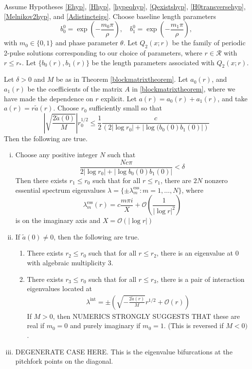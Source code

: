 \documentclass[thesis.tex]{subfiles}
\begin{document}
\begin{theorem}\label{theorem:2peigscase1}
Assume Hypotheses \ref{Ehyp}, \ref{Hhyp}, \ref{hypeqhyp}, \ref{Qexistshyp}, \ref{H0transversehyp}, \ref{Melnikov2hyp}, and \ref{Adistincteigs}. Choose baseline length parameters
\[
b_0^0 = \exp\left(-\frac{m_0 \pi}{\rho}\right), \quad b_1^0 = \exp\left(-\frac{m_1 \pi}{\rho}\right),
\] 
with $m_0 \in \{ 0, 1\}$ and phase parameter $\theta$. Let $Q_2(x; r)$ be the family of periodic 2-pulse solutions corresponding to our choice of parameters, where $r \in \mathcal{R}$ with $r \leq r_*$. Let $\{ b_0(r), b_1(r) \}$ be the length parameters associated with $Q_2(x; r)$.

Let $\delta > 0$ and $M$ be as in Theorem \ref{blockmatrixtheorem}. Let $a_0(r)$, and $a_1(r)$ be the coefficients of the matrix $A$ in \ref{blockmatrixtheorem}, where we have made the dependence on $r$ explicit. Let $a(r) = a_0(r) + a_1(r)$, and take $a(r) = r \tilde{a}(r)$. Choose $r_0$ sufficiently small so that 
\begin{equation}\label{nobubblecond}
\left| \sqrt{\frac{2 \tilde{a}(0)}{M}}\right|r_0^{1/2} \leq \frac{1}{2} \frac{c}{\left( 2 |\log r_0| + |\log( b_0(0) b_1(0) |\right)}
\end{equation}
Then the following are true.

\begin{enumerate}[(i)]
\item Choose any positive integer $N$ such that
\[
\frac{N c \pi}{2 |\log r_0| + |\log b_0(0) b_1(0)| } < \delta
\]
Then there exists $r_1 \leq r_0$ such that for all $r\leq r_1$, there are $2N$ nonzero essential spectrum eigenvalues $\lambda = \{ \pm \lambda_m^{\text{ess}} : m = 1, \dots, N\}$, where
\[
\lambda_m^{\text{ess}}(r) = c \frac{m \pi i}{X}+  \mathcal{O}\left( \frac{1}{|\log r|^2} \right)
\]
is on the imaginary axis and $X = \mathcal{O}(|\log r|)$

\item If $\tilde{a}(0) \neq 0$, then the following are true.
\begin{enumerate}
	\item There exists $r_2 \leq r_0$ such that for all $r \leq r_2$, there is an eigenvalue at 0 with algebraic multiplicity 3.

	\item There exists $r_3 \leq r_0$ such that for all $r \leq r_3$, there is a pair of interaction eigenvalues located at
	\begin{align*}
	\lambda^{\text{int}} = \pm \left( \sqrt{-\frac{2 \tilde{a}(r)}{M}}r^{1/2} + \mathcal{O}\left( r \right) \right)
	\end{align*}
	If $M > 0$, then NUMERICS STRONGLY SUGGESTS THAT these are real if $m_0 = 0$ and purely imaginary if $m_0 = 1$. (This is reversed if $M < 0)$. 
\end{enumerate}
\item DEGENERATE CASE HERE. This is the eigenvalue bifurcations at the pitchfork points on the diagonal.

\end{enumerate}
\end{theorem}
\end{document}
